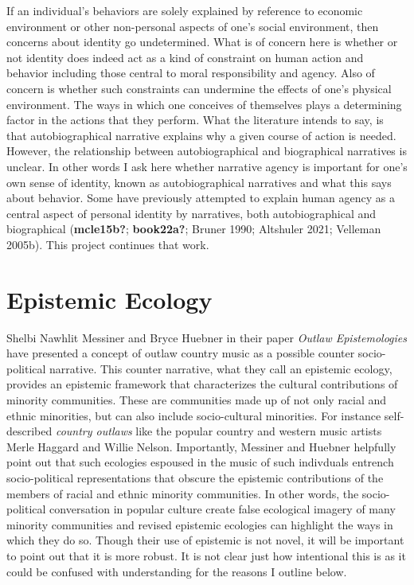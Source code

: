\documentclass[12pt]{book}
\theoremstyle{definition}
\theoremstyle{remark}
\begin{document}
If an individual's behaviors are solely explained by reference to economic environment or other non-personal aspects of one's social environment, then concerns about identity go undetermined. What is of concern here is whether or not identity does indeed act as a kind of constraint on human action and behavior including those central to moral responsibility and agency. Also of concern is whether such constraints can undermine the effects of one's physical environment. The ways in which one conceives of themselves plays a determining factor in the actions that they perform. What the literature intends to say, is that autobiographical narrative explains why a given course of action is needed. However, the relationship between autobiographical and biographical narratives is unclear. In other words I ask here whether narrative agency is important for one's own sense of identity, known as autobiographical narratives and what this says about behavior. Some have previously attempted to explain human agency as a central aspect of personal identity by narratives, both autobiographical and biographical (\textbf{mcle15b?}; \textbf{book22a?}; Bruner 1990; Altshuler 2021; Velleman 2005b). This project continues that work.

\section{Epistemic Ecology}\label{epistemic-ecology}

Shelbi Nawhlit Messiner and Bryce Huebner in their paper \emph{Outlaw Epistemologies} have presented a concept of outlaw country music as a possible counter socio-political narrative. This counter narrative, what they call an epistemic ecology, provides an epistemic framework that characterizes the cultural contributions of minority communities. These are communities made up of not only racial and ethnic minorities, but can also include socio-cultural minorities. For instance self-described \emph{country outlaws} like the popular country and western music artists Merle Haggard and Willie Nelson. Importantly, Messiner and Huebner helpfully point out that such ecologies espoused in the music of such indivduals entrench socio-political representations that obscure the epistemic contributions of the members of racial and ethnic minority communities. In other words, the socio-political conversation in popular culture create false ecological imagery of many minority communities and revised epistemic ecologies can highlight the ways in which they do so. Though their use of epistemic is not novel, it will be important to point out that it is more robust. It is not clear just how intentional this is as it could be confused with understanding for the reasons I outline below.
\end{document}
